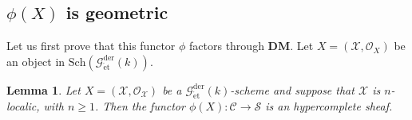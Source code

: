 \documentclass[12pt,a4paper,reqno]{amsart}
\theoremstyle{plain}
\newtheorem{lem}[thm]{Lemma}
\theoremstyle{definition}
\theoremstyle{remark}
\numberwithin{equation}{section}
\begin{document}
\subsection{$\phi(X)$ is geometric}

Let us first prove that this functor $\phi$ factors through $\mathbf{DM}$.
Let $X = ({\mathcal X}, {\mathcal O}_X)$ be an object in $\mathrm{Sch}({{\mathcal G}_{\mathrm{\acute{e}t}}^\mathrm{der}(k)})$.

\begin{lem}
	Let $X = ({\mathcal X}, {\mathcal O}_{\mathcal X})$ be a ${{\mathcal G}_{\mathrm{\acute{e}t}}^\mathrm{der}(k)}$-scheme and suppose that ${\mathcal X}$ is $n$-localic, with $n \ge 1$.
	Then the functor $\phi(X) \colon {\mathcal C} \to {\mathcal S}$ is an hypercomplete sheaf.
\end{lem}
\end{document}
